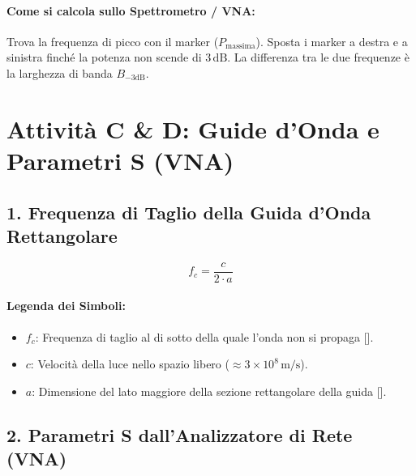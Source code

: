 \documentclass[openany,a4paper,12pt]{book}
\begin{document}
\paragraph{Come si calcola sullo Spettrometro / VNA:}
Trova la frequenza di picco con il marker ($P_{\text{massima}}$). Sposta i marker a destra e a sinistra finché la potenza non scende di $3\,\text{dB}$. La differenza tra le due frequenze è la larghezza di banda $B_{-3\text{dB}}$.

\newpage

\section{Attività C \& D: Guide d'Onda e Parametri S (VNA)}

\subsection{1. Frequenza di Taglio della Guida d'Onda Rettangolare}

\begin{tcolorbox}[title=Formula per il Modo Fondamentale $\text{TE}_{10}$]
\[
f_c = \frac{c}{2 \cdot a}
\]
\end{tcolorbox}

\paragraph{Legenda dei Simboli:}
\begin{itemize}
    \item $f_c$: Frequenza di taglio al di sotto della quale l'onda non si propaga [].
    \item $c$: Velocità della luce nello spazio libero ($\approx 3 \times 10^8\,\text{m/s}$).
    \item $a$: Dimensione del lato maggiore della sezione rettangolare della guida [].
\end{itemize}

\subsection{2. Parametri S dall'Analizzatore di Rete (VNA)}
\end{document}
